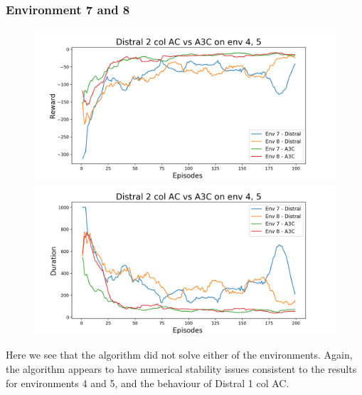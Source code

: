 \documentclass[12pt]{report}
\begin{document}
\subsubsection{Environment 7 and 8}
\begin{figure}[H]
\centering
\begin{minipage}{.5\textwidth}
\centering
\includegraphics[width=\textwidth]{figs/d2_col_ac/d2_col_ac_7_8_rwd.png}
\end{minipage}%
\centering
\begin{minipage}{.5\textwidth}
\centering
\includegraphics[width=\textwidth]{figs/d2_col_ac/d2_col_ac_7_8_dur.png}
\end{minipage}%
\end{figure}
Here we see that the algorithm did not solve either of the environments. Again, the algorithm appears to have numerical stability issues consistent to the results for environments 4 and 5, and the behaviour of Distral 1 col AC.
\end{document}
